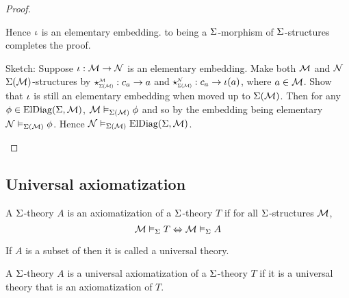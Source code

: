 \begin{proof}
\begin{forward}
        Hence $\iota$ is an elementary embedding.
         to being a $\Sigma$-morphism of $\Sigma$-structures
        completes the proof.
    \end{forward}
    \begin{backward}
        Sketch: Suppose $\iota : \mathcal{M} \to \mathcal{N}$ is an elementary embedding.
        Make both $\mathcal{M}$ and $\mathcal{N}$ $\Sigma(\mathcal{M})$-structures by 
        $\intp{\Si(\MM)}{\MM}: c_a \to a$ and 
        $\intp{\Si(\MM)}{\NN}: c_a \to \io(a)$,
        where $a \in {\mathcal{M}}$.
        Show that $\iota$ is still an elementary embedding
        when moved up to $\Sigma(\mathcal{M})$.
        Then for any $\phi \in \mathrm{ElDiag}(\Sigma,\mathcal{M})$,
        $\mathcal{M} \vDash_{\Sigma(\mathcal{M})} \phi$ and so by the embedding being elementary
        $\mathcal{N} \vDash_{\Sigma(\mathcal{M})} \phi$.
        Hence $\mathcal{N} \vDash_{\Sigma(\mathcal{M})} \mathrm{ElDiag}(\Sigma,\mathcal{M})$.
    \end{backward}
\end{proof}

\subsection{Universal axiomatization}
\begin{dfn}[Axiomatization]
    A $\Sigma$-theory $A$ is an axiomatization of a 
    $\Sigma$-theory $T$ if for all $\Sigma$-structures $\mathcal{M}$,
    \[\mathcal{M} \vDash_{\Sigma} T \Leftrightarrow \mathcal{M} \vDash_{\Sigma} A\]
\end{dfn}

\begin{dfn}
    If $A$ is a subset of 
    then it is called a universal theory.
    
    A $\Sigma$-theory $A$ is a universal axiomatization of a 
    $\Sigma$-theory $T$ if it is a universal theory that is an 
    axiomatization of $T$.
\end{dfn}

